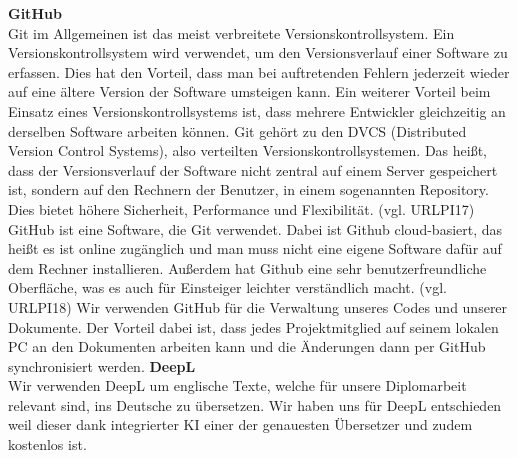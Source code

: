 \documentclass[11pt, twoside]{article}
\begin{document}
\vspace{4mm}\newline
\textbf{GitHub} \\
Git im Allgemeinen ist das meist verbreitete Versionskontrollsystem. Ein Versionskontrollsystem wird verwendet, um den Versionsverlauf einer Software zu erfassen. Dies hat den Vorteil, dass man bei auftretenden Fehlern jederzeit wieder auf eine ältere Version der Software umsteigen kann. Ein weiterer Vorteil beim Einsatz eines Versionskontrollsystems ist, dass mehrere Entwickler gleichzeitig an derselben Software arbeiten können. Git gehört zu den DVCS (Distributed Version Control Systems), also verteilten Versionskontrollsystemen. Das heißt, dass der Versionsverlauf der Software nicht zentral auf einem Server gespeichert ist, sondern auf den Rechnern der Benutzer, in einem sogenannten Repository. Dies bietet höhere Sicherheit, Performance und Flexibilität. (vgl. URLPI17) \\ 
GitHub ist eine Software, die Git verwendet. Dabei ist Github cloud-basiert, das heißt es ist online zugänglich und man muss nicht eine eigene Software dafür auf dem Rechner installieren. Außerdem hat Github  eine sehr benutzerfreundliche Oberfläche, was es auch für Einsteiger leichter verständlich macht. (vgl. URLPI18)
Wir verwenden GitHub für die Verwaltung unseres Codes und unserer Dokumente. Der Vorteil dabei ist, dass jedes Projektmitglied auf seinem lokalen PC an den Dokumenten arbeiten kann und die Änderungen dann per GitHub synchronisiert werden.
\vspace{4mm}\newline
\textbf{DeepL} \\
Wir verwenden DeepL um englische Texte, welche für unsere Diplomarbeit relevant sind, ins Deutsche zu übersetzen. Wir haben uns für DeepL entschieden weil dieser dank integrierter KI einer der genauesten Übersetzer und zudem kostenlos ist.
\end{document}
